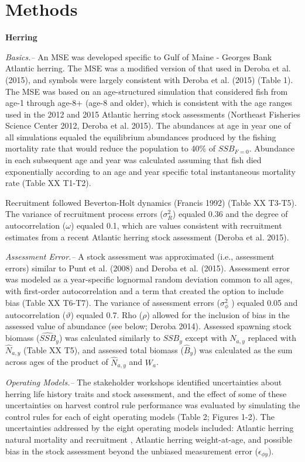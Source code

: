 \documentclass[]{article}
\begin{document}
\section{Methods}\label{methods}

\textbf{Herring}

\emph{Basics.--} An MSE was developed specific to Gulf of Maine -
Georges Bank Atlantic herring. The MSE was a modified version of that
used in Deroba et al. (2015), and symbols were largely consistent with
Deroba et al. (2015) (Table 1). The MSE was based on an age-structured
simulation that considered fish from age-1 through age-8+ (age-8 and
older), which is consistent with the age ranges used in the 2012 and
2015 Atlantic herring stock assessments (Northeast Fisheries Science
Center 2012, Deroba et al. 2015). The abundances at age in year one of
all simulations equaled the equilibrium abundances produced by the
fishing mortality rate that would reduce the population to 40\% of
\(SSB_{F=0}\). Abundance in each subsequent age and year was calculated
assuming that fish died exponentially according to an age and year
specific total instantaneous mortality rate (Table XX T1-T2).

Recruitment followed Beverton-Holt dynamics (Francis 1992) (Table XX
T3-T5). The variance of recruitment process errors (\(\sigma_R^2\))
equaled 0.36 and the degree of autocorrelation (\(\omega\)) equaled 0.1,
which are values consistent with recruitment estimates from a recent
Atlantic herring stock assessment (Deroba et al. 2015).

\emph{Assessment Error.--} A stock assessment was approximated (i.e.,
assessment errors) similar to Punt et al. (2008) and Deroba et al.
(2015). Assessment error was modeled as a year-specific lognormal random
deviation common to all ages, with first-order autocorrelation and a
term that created the option to include bias (Table XX T6-T7). The
variance of assessment errors (\(\sigma_\phi^2\) ) equaled 0.05 and
autocorrelation (\(\vartheta\)) equaled 0.7. Rho (\(\rho\)) allowed for
the inclusion of bias in the assessed value of abundance (see below;
Deroba 2014). Assessed spawning stock biomass (\(\widehat{SSB}_y\)) was
calculated similarly to \(SSB_y\) except with \(N_{a,y}\) replaced with
\(\widehat{N}_{a,y}\) (Table XX T5), and assessed total biomass
(\(\widehat{B}_y\)) was calculated as the sum across ages of the product
of \(\widehat{N}_{a,y}\) and \(W_a\).

\emph{Operating Models.--} The stakeholder workshops identified
uncertainties about herring life history traits and stock assessment,
and the effect of some of these uncertainties on harvest control rule
performance was evaluated by simulating the control rules for each of
eight operating models (Table 2; Figures 1-2). The uncertainties
addressed by the eight operating models included: Atlantic herring
natural mortality and recruitment , Atlantic herring weight-at-age, and
possible bias in the stock assessment beyond the unbiased measurement
error (\(\epsilon_{\phi y}\)).
\end{document}
